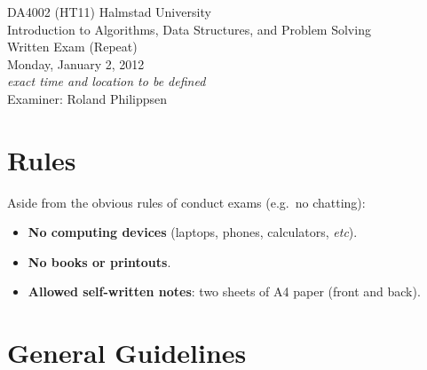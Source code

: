 \documentclass[a4paper]{article}
\begin{document}
\pagestyle{empty}
\thispagestyle{empty}



\noindent
\begin{minipage}{\columnwidth}
  \centering
  \Large
  DA4002 (HT11) Halmstad University\\
  Introduction to Algorithms, Data Structures, and Problem Solving\\[3\baselineskip]
  \Huge
  Written Exam (Repeat)\\
  \Large
  Monday, January 2, 2012\\
  \emph{exact time and location to be defined}\\[2\baselineskip]
  Examiner: Roland Philippsen
\end{minipage}

\vfill

\noindent
\begin{center}
\end{center}

\vfill



\section*{Rules}

Aside from the obvious rules of conduct exams (e.g.\ no chatting):

\begin{itemize}
\item
  \textbf{No computing devices} (laptops, phones, calculators, \emph{etc}).
\item
  \textbf{No books or printouts}.
\item
  \textbf{Allowed self-written notes}: two sheets of A4 paper (front and back).
\end{itemize}



\section*{General Guidelines}
\end{document}
